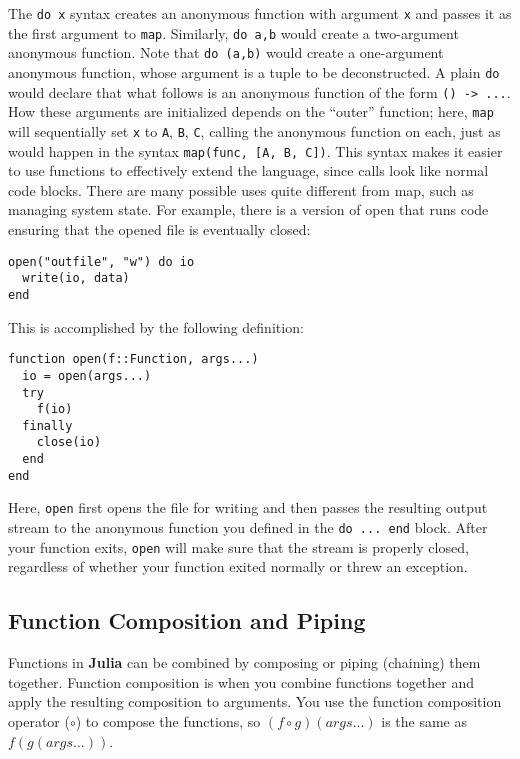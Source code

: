 \documentclass[
]{article}
\begin{document}
The \texttt{do\ x} syntax creates an anonymous function with argument
\texttt{x} and passes it as the first argument to \texttt{map}.
Similarly, \texttt{do\ a,b} would create a two-argument anonymous
function. Note that \texttt{do\ (a,b)} would create a one-argument
anonymous function, whose argument is a tuple to be deconstructed. A
plain \texttt{do} would declare that what follows is an anonymous
function of the form \texttt{()\ -\textgreater{}\ ...}. How these
arguments are initialized depends on the ``outer'' function; here,
\texttt{map} will sequentially set \texttt{x} to \texttt{A}, \texttt{B},
\texttt{C}, calling the anonymous function on each, just as would happen
in the syntax \texttt{map(func,\ {[}A,\ B,\ C{]})}. This syntax makes it
easier to use functions to effectively extend the language, since calls
look like normal code blocks. There are many possible uses quite
different from map, such as managing system state. For example, there is
a version of open that runs code ensuring that the opened file is
eventually closed:

\begin{verbatim}
open("outfile", "w") do io
  write(io, data)
end
\end{verbatim}

This is accomplished by the following definition:

\begin{verbatim}
function open(f::Function, args...)
  io = open(args...)
  try
    f(io)
  finally
    close(io)
  end
end
\end{verbatim}

Here, \texttt{open} first opens the file for writing and then passes the
resulting output stream to the anonymous function you defined in the
\texttt{do\ ...\ end} block. After your function exits, \texttt{open}
will make sure that the stream is properly closed, regardless of whether
your function exited normally or threw an exception.

\hypertarget{function-composition-and-piping}{%
\subsection{Function Composition and
Piping}\label{function-composition-and-piping}}

Functions in \textbf{Julia} can be combined by composing or piping
(chaining) them together. Function composition is when you combine
functions together and apply the resulting composition to arguments. You
use the function composition operator (\(\circ\)) to compose the
functions, so \((f\circ g)(args...)\) is the same as \(f(g(args...))\).
\end{document}
